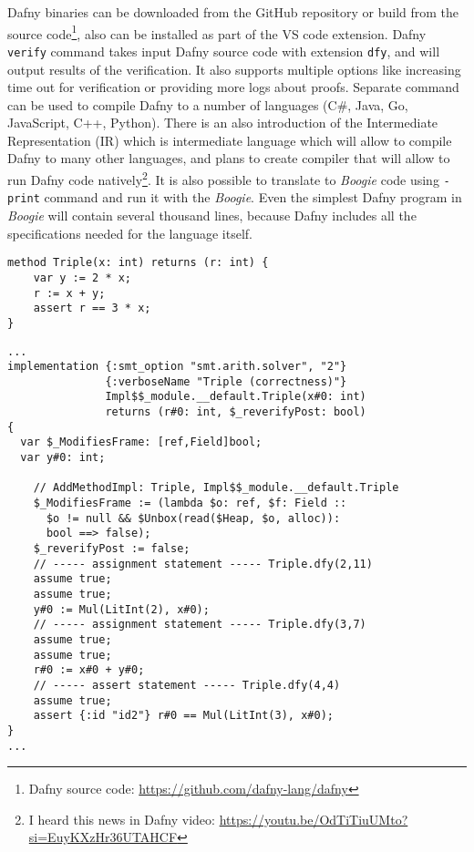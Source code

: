 Dafny binaries can be downloaded from the GitHub repository or build from the source code\footnote{Dafny source code: \url{https://github.com/dafny-lang/dafny}}, also can be installed as part of the VS code extension. Dafny \texttt{verify} command takes input Dafny source code with extension \texttt{dfy}, and will output results of the verification. It also supports multiple options like increasing time out for verification or providing more logs about proofs. Separate command can be used to compile Dafny to a number of languages (C#, Java, Go, JavaScript, C++, Python). There is an also introduction of the Intermediate Representation (IR) which is intermediate language which will allow to compile Dafny to many other languages, and plans to create compiler that will allow to run Dafny code natively\footnote{I heard this news in Dafny video: \url{https://youtu.be/OdTiTiuUMto?si=EuyKXzHr36UTAHCF}}.
It is also possible to translate to \textit{Boogie} code using \texttt{-print} command and run it with the \textit{Boogie}. Even the simplest Dafny program in \textit{Boogie} will contain several thousand lines, because Dafny includes all the specifications needed for the language itself.

\begin{lstlisting}[language=DafnyJS,caption={Dafny Triple method},label={lst:triple}]
method Triple(x: int) returns (r: int) {
    var y := 2 * x;
    r := x + y;
    assert r == 3 * x;
}
\end{lstlisting}

\begin{lstlisting}[language=DafnyJS,caption={Boogie Triple method, part of the code translated from Dafny to Boogie},label={lst:boogietriple}]
...
implementation {:smt_option "smt.arith.solver", "2"}
               {:verboseName "Triple (correctness)"}
               Impl$$_module.__default.Triple(x#0: int)
               returns (r#0: int, $_reverifyPost: bool)
{
  var $_ModifiesFrame: [ref,Field]bool;
  var y#0: int;

    // AddMethodImpl: Triple, Impl$$_module.__default.Triple
    $_ModifiesFrame := (lambda $o: ref, $f: Field :: 
      $o != null && $Unbox(read($Heap, $o, alloc)): 
      bool ==> false);
    $_reverifyPost := false;
    // ----- assignment statement ----- Triple.dfy(2,11)
    assume true;
    assume true;
    y#0 := Mul(LitInt(2), x#0);
    // ----- assignment statement ----- Triple.dfy(3,7)
    assume true;
    assume true;
    r#0 := x#0 + y#0;
    // ----- assert statement ----- Triple.dfy(4,4)
    assume true;
    assert {:id "id2"} r#0 == Mul(LitInt(3), x#0);
}
...
\end{lstlisting}

